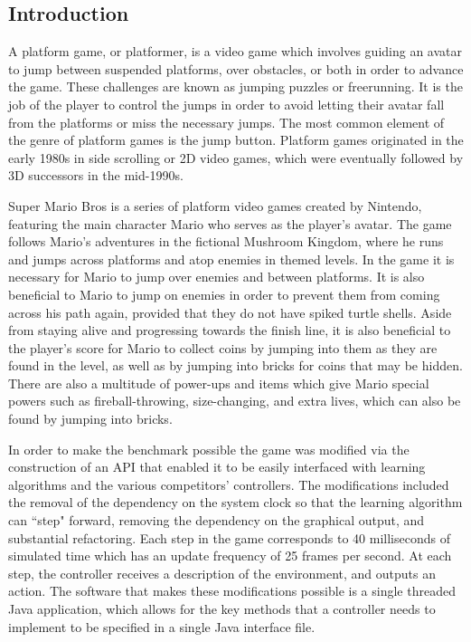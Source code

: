 \documentclass[12pt]{article}
\begin{document}
\setlength{\columnsep}{.65cm}
\begin{multicols}{2}
\section * {Introduction}
A platform game, or platformer, is a video game which involves guiding an avatar to jump between suspended 
platforms, over obstacles, or both in order to advance the game. These challenges are known as jumping puzzles 
or freerunning. It is the job of the player to control the jumps in order to avoid letting their avatar fall from the 
platforms or miss the necessary jumps. The most common element of the genre of platform games is the jump 
button. Platform games originated in the early 1980s in side scrolling or 2D video games, which were eventually 
followed by 3D successors in the mid-1990s.

Super Mario Bros is a series of platform video games created by Nintendo, featuring the main character Mario who 
serves as the player's avatar. The game follows Mario's adventures in the fictional Mushroom Kingdom, where he 
runs and jumps across platforms and atop enemies in themed levels. In the game it is necessary for Mario to jump 
over enemies and between platforms. It is also beneficial to Mario to jump on enemies in order to prevent them 
from coming across his path again, provided that they do not have spiked turtle shells. Aside from staying alive and 
progressing towards the finish line, it is also beneficial to the player's score for Mario to collect coins by jumping 
into them as they are found in the level, as well as by jumping into bricks for coins that may be hidden. There are 
also a multitude of power-ups and items which give Mario special powers such as fireball-throwing, size-changing, 
and extra lives, which can also be found by jumping into bricks.

In order to make the benchmark possible the game was modified via the construction of an API that enabled it to be 
easily interfaced with learning algorithms and the various competitors' controllers. The modifications included the 
removal of the dependency on the system clock so that the learning algorithm can ``step" forward, removing the 
dependency on the graphical output, and substantial refactoring. Each step in the game corresponds to 40 
milliseconds of simulated time which has an update frequency of 25 frames per second. At each step, the controller 
receives a description of the environment, and outputs an action. The software that makes these modifications 
possible is a single threaded Java application, which allows for the key methods that a controller needs to 
implement to be specified in a single Java interface file.


\end{multicols}
\end{document}
